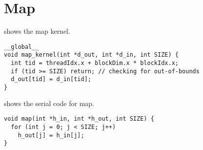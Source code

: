 \section{Map}
\label{sec:map}

 shows the map kernel.

\begin{lstlisting}[caption={Map kernel}, label={lst:map par}]
__global__ 
void map_kernel(int *d_out, int *d_in, int SIZE) {
  int tid = threadIdx.x + blockDim.x * blockIdx.x;
  if (tid >= SIZE) return; // checking for out-of-bounds
  d_out[tid] = d_in[tid];
}
\end{lstlisting}

 shows the serial code for map.

\begin{lstlisting}[caption={Serial map}, label={lst:map seq}]
void map(int *h_in, int *h_out, int SIZE) {
  for (int j = 0; j < SIZE; j++) 
    h_out[j] = h_in[j];
}
\end{lstlisting}
